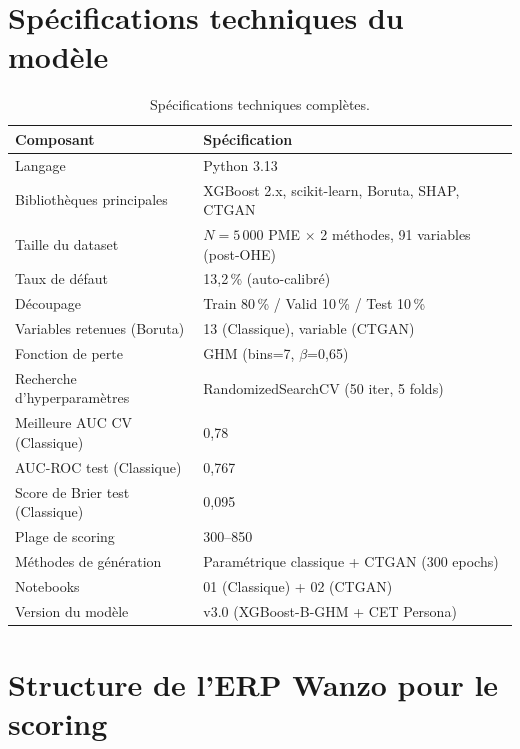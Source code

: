\documentclass[12pt, a4paper, twocolumn]{article}
\begin{document}
\begin{appendices}

\section{Spécifications techniques du modèle}
\label{app:specs}

\begin{table}[htbp]
\centering
\caption{Spécifications techniques complètes.}
\label{tab:specs}
\begin{tabularx}{\textwidth}{@{}lX@{}}
\toprule
\textbf{Composant} & \textbf{Spécification} \\
\midrule
Langage & Python 3.13 \\
Bibliothèques principales & XGBoost 2.x, scikit-learn, Boruta, SHAP, CTGAN \\
Taille du dataset & $N = 5\,000$ PME $\times$ 2 méthodes, 91 variables (post-OHE) \\
Taux de défaut & 13,2\,\% (auto-calibré) \\
Découpage & Train 80\,\% / Valid 10\,\% / Test 10\,\% \\
Variables retenues (Boruta) & 13 (Classique), variable (CTGAN) \\
Fonction de perte & GHM (bins=7, $\beta$=0,65) \\
Recherche d'hyperparamètres & RandomizedSearchCV (50 iter, 5 folds) \\
Meilleure AUC CV (Classique) & 0,78 \\
AUC-ROC test (Classique) & 0,767 \\
Score de Brier test (Classique) & 0,095 \\
Plage de scoring & 300--850 \\
Méthodes de génération & Paramétrique classique + CTGAN (300 epochs) \\
Notebooks & 01 (Classique) + 02 (CTGAN) \\
Version du modèle & v3.0 (XGBoost-B-GHM + CET Persona) \\
\bottomrule
\end{tabularx}
\end{table}

\section{Structure de l'ERP Wanzo pour le scoring}
\label{app:erp}


\end{appendices}
\end{document}
